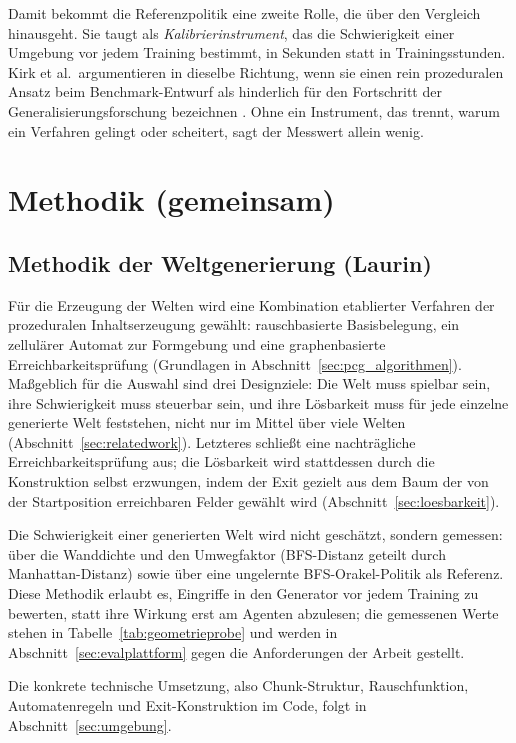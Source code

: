 \documentclass[11pt,a4paper]{article}
\let\sfOldSection\section
\renewcommand{\section}{\clearpage\sfOldSection}
\begin{document}
Damit bekommt die Referenzpolitik eine zweite Rolle, die über den Vergleich
hinausgeht. Sie taugt als \emph{Kalibrierinstrument}, das die Schwierigkeit
einer Umgebung vor jedem Training bestimmt, in Sekunden statt in
Trainingsstunden. Kirk et al.\ argumentieren in dieselbe Richtung, wenn sie
einen rein prozeduralen Ansatz beim Benchmark-Entwurf als hinderlich für den
Fortschritt der Generalisierungsforschung bezeichnen \cite{kirk2023survey}. Ohne
ein Instrument, das trennt, warum ein Verfahren gelingt oder scheitert, sagt der
Messwert allein wenig.
\section{Methodik (gemeinsam)}
\label{sec:methodikkapitel}

\subsection{Methodik der Weltgenerierung (Laurin)}
\label{sec:methodikwelt}

Für die Erzeugung der Welten wird eine Kombination etablierter Verfahren der
prozeduralen Inhaltserzeugung gewählt: rauschbasierte Basisbelegung, ein
zellulärer Automat zur Formgebung und eine graphenbasierte
Erreichbarkeitsprüfung (Grundlagen in Abschnitt~\ref{sec:pcg_algorithmen}).
Maßgeblich für die Auswahl sind drei Designziele: Die Welt muss spielbar
sein, ihre Schwierigkeit muss steuerbar sein, und ihre Lösbarkeit muss für
jede einzelne generierte Welt feststehen, nicht nur im Mittel über viele
Welten (Abschnitt~\ref{sec:relatedwork}). Letzteres schließt eine
nachträgliche Erreichbarkeitsprüfung aus; die Lösbarkeit wird stattdessen
durch die Konstruktion selbst erzwungen, indem der Exit gezielt aus dem
Baum der von der Startposition erreichbaren Felder gewählt wird
(Abschnitt~\ref{sec:loesbarkeit}).

Die Schwierigkeit einer generierten Welt wird nicht geschätzt, sondern
gemessen: über die Wanddichte und den Umwegfaktor (BFS-Distanz geteilt
durch Manhattan-Distanz) sowie über eine ungelernte BFS-Orakel-Politik als
Referenz. Diese Methodik erlaubt es, Eingriffe in den Generator vor jedem
Training zu bewerten, statt ihre Wirkung erst am Agenten abzulesen; die
gemessenen Werte stehen in Tabelle~\ref{tab:geometrieprobe} und werden in
Abschnitt~\ref{sec:evalplattform} gegen die Anforderungen der Arbeit
gestellt.

Die konkrete technische Umsetzung, also Chunk-Struktur, Rauschfunktion,
Automatenregeln und Exit-Konstruktion im Code, folgt in
Abschnitt~\ref{sec:umgebung}.
\end{document}
